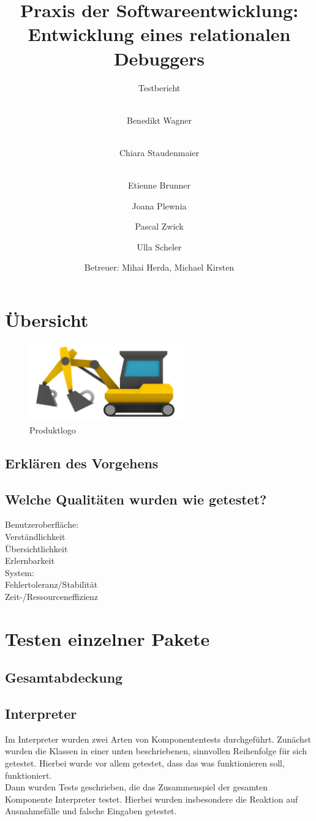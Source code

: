\documentclass[parskip=full]{scrartcl}
\title{
	\vspace{2cm}
	\myfont 
	Praxis der Softwareentwicklung:\\ 
	Entwicklung eines relationalen Debuggers\\
}
\subtitle{
	\vspace{1cm}
	\myfont
	Testbericht
}
\author{
	\vspace{1cm} \\
	Benedikt Wagner\\
	\and 
        \vspace{1cm} \\ 
        Chiara Staudenmaier\\
        \and 
        \vspace{1cm} \\
        Etienne Brunner\\
	\and Joana Plewnia\\
	\and Pascal Zwick\\
	\and Ulla Scheler\\
	\vspace{1cm}
	\and Betreuer: Mihai Herda, Michael Kirsten
	\vspace{4cm}
}
\begin{document}
\clearpage
\maketitle
{}
\newpage

\tableofcontents
\newpage
{}

\section{Übersicht}

\begin{figure}[!h]
\centering
\includegraphics[width=0.6\textwidth]{../Plichtenheft/logo_nongi.png}
\caption{Produktlogo}
\end{figure}

\subsection{Erklären des Vorgehens}
\subsection{Welche Qualitäten wurden wie getestet?}

Benutzeroberfläche: \\
Verständlichkeit \\
Übersichtlichkeit \\
Erlernbarkeit \\

System: \\
Fehlertoleranz/Stabilität \\
Zeit-/Ressourceneffizienz \\


\section{Testen einzelner Pakete}
\subsection{Gesamtabdeckung}
\subsection{Interpreter}
Im Interpreter wurden zwei Arten von Komponententests durchgeführt. Zunächst wurden die Klassen in einer unten beschriebenen, sinnvollen Reihenfolge für sich getestet. 
Hierbei wurde vor allem getestet, dass das was funktionieren soll, funktioniert.\\ %
Dann wurden Tests geschrieben, die das Zusammenspiel der gesamten Komponente Interpreter testet. Hierbei wurden insbesondere die Reaktion auf Ausnahmefälle und falsche Eingaben getestet.
\end{document}
